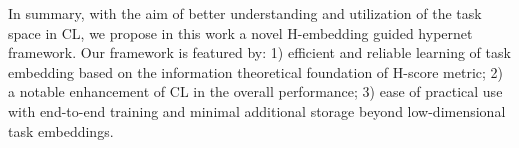 In summary, with the aim of better understanding and utilization of the task space in CL, we propose in this work a novel H-embedding guided hypernet framework.
Our framework is featured by: 1) efficient and reliable learning of task embedding based on the information theoretical foundation of H-score metric; 2) a notable enhancement of CL in the overall performance; 3) ease of practical use with end-to-end training and minimal additional storage beyond low-dimensional task embeddings. 





